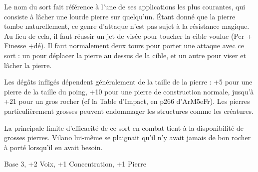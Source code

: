 {{Le nom du sort fait référence à l'une de ses applications les plus courantes, qui consiste à lâcher une lourde pierre sur quelqu'un. Étant donné que la pierre tombe naturellement, ce genre d'attaque n'est pas sujet à la résistance magique. Au lieu de cela, il faut réussir un jet de visée pour toucher la cible voulue (Per + Finesse +dé). Il faut normalement deux tours pour porter une attaque avec ce sort : un pour déplacer la pierre au dessus de la cible, et un autre pour viser et lâcher la pierre.

Les dégâts infligés dépendent généralement de la taille de la pierre : +5 pour une pierre de la taille du poing, +10 pour une pierre de construction normale, jusqu'à +21 pour un gros rocher (cf la Table d'Impact, en p266 d'ArM5eFr). Les pierres particulièrement grosses peuvent endommager les structures comme les créatures.

La principale limite d'efficacité de ce sort en combat tient à la disponibilité de grosses pierres. Vilano lui-même se plaignait qu'il n'y avait jamais de bon rocher à porté lorsqu'il en avait besoin.
}{Base 3, +2 Voix, +1 Concentration, +1 Pierre}
}



